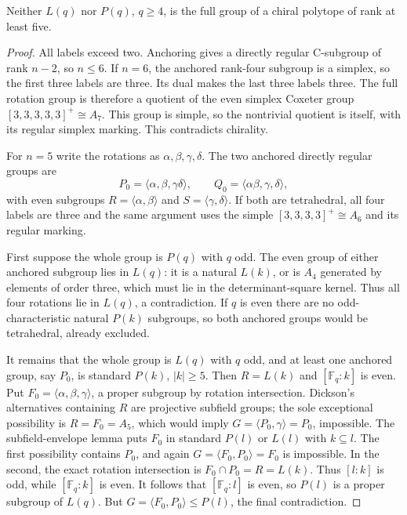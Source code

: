 \begin{theorem}\label{E.ChiralRankBound}
Neither $L(q)$ nor $P(q)$, $q\ge4$, is the full group of a chiral
polytope of rank at least five.
\end{theorem}
\begin{proof}
All labels exceed two. Anchoring gives a directly regular C-subgroup of
rank $n-2$, so $n\le6$. If $n=6$, the anchored rank-four subgroup is a
simplex, so the first three labels are three. Its dual makes the last
three labels three. The full rotation group is therefore a quotient of
the even simplex Coxeter group $[3,3,3,3,3]^+\cong A_7$.
This group is simple, so the nontrivial quotient is itself, with its
regular simplex marking. This contradicts chirality.

For $n=5$ write the rotations as $\alpha,\beta,\gamma,\delta$.
The two anchored directly regular groups are
\[
 P_0=\langle\alpha,\beta,\gamma\delta\rangle,
 \qquad Q_0=\langle\alpha\beta,\gamma,\delta\rangle,
\]
with even subgroups $R=\langle\alpha,\beta\rangle$ and
$S=\langle\gamma,\delta\rangle$. If both are tetrahedral,
all four labels are three and the same argument uses the simple
$[3,3,3,3]^+\cong A_6$ and its regular marking.

First suppose the whole group is $P(q)$ with $q$ odd. The even group
of either anchored subgroup lies in $L(q)$: it is a natural $L(k)$,
or is $A_4$ generated by elements of order three, which must lie in
the determinant-square kernel. Thus all four rotations lie in $L(q)$,
a contradiction. If $q$ is even there are no odd-characteristic natural
$P(k)$ subgroups, so both anchored groups would be tetrahedral, already
excluded.

It remains that the whole group is $L(q)$ with $q$ odd, and at least
one anchored group, say $P_0$, is standard $P(k)$, $|k|\ge5$.
Then $R=L(k)$ and $[\mathbb F_q:k]$ is even. Put
$F_0=\langle\alpha,\beta,\gamma\rangle$, a proper subgroup by
rotation intersection. Dickson's alternatives containing $R$ are
projective subfield groups; the sole exceptional possibility is
$R=F_0=A_5$, which would imply
$G=\langle P_0,\gamma\rangle=P_0$, impossible.
The subfield-envelope lemma puts $F_0$ in standard $P(l)$ or $L(l)$
with $k\subseteq l$. The first possibility contains $P_0$, and again
$G=\langle F_0,P_0\rangle=F_0$ is impossible.
In the second, the exact rotation intersection is
$F_0\cap P_0=R=L(k)$. Thus $[l:k]$ is odd, while
$[\mathbb F_q:k]$ is even. It follows that
$[\mathbb F_q:l]$ is even, so $P(l)$ is a proper subgroup of $L(q)$.
But $G=\langle F_0,P_0\rangle\le P(l)$, the final contradiction.
\end{proof}
